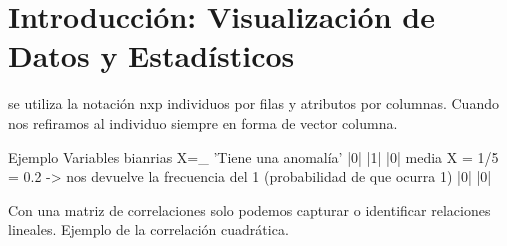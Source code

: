 
\newcommand{\estudiante}{García Justel, Alan}
\newcommand{\titulo}{MÁSTER EN INGENIERÍA COMPUTACIONAL Y SISTEMAS INTELIGENTES}
\newcommand{\asignatura}{EXPLORACIÓN Y ANÁLISIS DE DATOS}
\newcommand{\portada}{common/no_signal.png}
\newcommand{\colorportada}{title_green}
\newcommand{\curso}{2024-2025}





\newpage


\section{Introducción: Visualización de Datos y Estadísticos}
se utiliza la notación nxp individuos por filas y atributos por columnas. Cuando nos refiramos al individuo siempre en forma de vector columna.

Ejemplo
Variables bianrias
X=_ 'Tiene una anomalía'
|0|
|1|
|0| media X = 1/5 = 0.2 -> nos devuelve la frecuencia del 1 (probabilidad de que ocurra 1)
|0|
|0|


Con una matriz de correlaciones solo podemos capturar o identificar relaciones lineales. Ejemplo de la correlación cuadrática.


